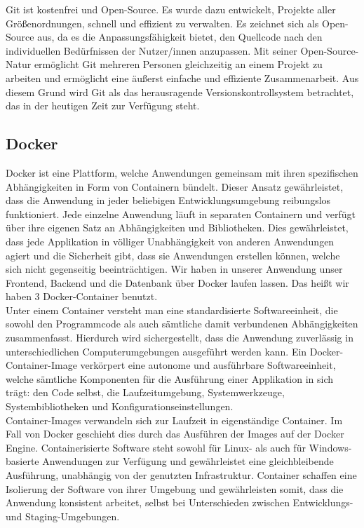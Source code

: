Git ist kostenfrei und Open-Source. Es wurde dazu entwickelt, Projekte aller 
Größenordnungen, schnell und effizient zu verwalten. 
Es zeichnet sich als Open-Source aus, da es die Anpassungsfähigkeit bietet, den Quellcode 
nach den individuellen Bedürfnissen der Nutzer/innen anzupassen. 
Mit seiner Open-Source-Natur ermöglicht Git mehreren Personen gleichzeitig an einem 
Projekt zu arbeiten und ermöglicht eine äußerst einfache und effiziente Zusammenarbeit. 
Aus diesem Grund wird Git als das herausragende Versionskontrollsystem betrachtet, 
das in der heutigen Zeit zur Verfügung steht. \cite{git_features}
\newpage

\subsection*{Docker}

Docker ist eine Plattform, welche Anwendungen gemeinsam mit ihren spezifischen Abhängigkeiten 
in Form von Containern bündelt. Dieser Ansatz gewährleistet, dass die Anwendung in 
jeder beliebigen Entwicklungsumgebung reibungslos funktioniert.
Jede einzelne Anwendung läuft in separaten Containern und verfügt über 
ihre eigenen Satz an Abhängigkeiten und Bibliotheken. Dies gewährleistet, dass jede 
Applikation in völliger Unabhängigkeit von anderen Anwendungen agiert und die Sicherheit gibt, 
dass sie Anwendungen erstellen können, welche sich nicht gegenseitig beeinträchtigen.
Wir haben in unserer Anwendung unser Frontend, Backend und die Datenbank über Docker laufen lassen.
Das heißt wir haben 3 Docker-Container benutzt. \cite{docker_explained} \\
 
Unter einem Container versteht man eine standardisierte Softwareeinheit, die sowohl den 
Programmcode als auch sämtliche damit verbundenen Abhängigkeiten zusammenfasst. 
Hierdurch wird sichergestellt, dass die Anwendung zuverlässig in unterschiedlichen 
Computerumgebungen ausgeführt werden kann. Ein Docker-Container-Image verkörpert eine 
autonome und ausführbare Softwareeinheit, welche sämtliche Komponenten für die Ausführung 
einer Applikation in sich trägt: den Code selbst, die Laufzeitumgebung, Systemwerkzeuge, 
Systembibliotheken und Konfigurationseinstellungen. \cite{docker_container} \\

Container-Images verwandeln sich zur Laufzeit in eigenständige Container. 
Im Fall von Docker geschieht dies durch das Ausführen der Images auf der Docker Engine. 
Containerisierte Software steht sowohl für Linux- als auch für Windows-basierte Anwendungen 
zur Verfügung und gewährleistet eine gleichbleibende Ausführung, unabhängig von der genutzten 
Infrastruktur. Container schaffen eine Isolierung der Software von ihrer Umgebung und 
gewährleisten somit, dass die Anwendung konsistent arbeitet, selbst bei Unterschieden 
zwischen Entwicklungs- und Staging-Umgebungen. \cite{docker_container}
\newpage
